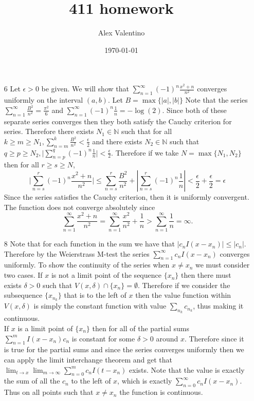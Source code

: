 \documentclass[12pt, letterpaper]{article}
\date{\today}
\author{Alex Valentino}
\title{411 homework}
\newcommand{\N}{\mathbb{N}}
\begin{document}
\begin{enumerate}
	\item[6]
	Let $\epsilon > 0$ be given.  We will show that $\sum_{n=1}^\infty (-1)^n \frac{x^2 + n}{n^2}$ converges uniformly on
	the interval $(a,b)$.  Let $B = \max\{|a|,|b|\}$   Note that the series $\sum_{n=1}^\infty \frac{B^2}{n^2} = \frac{\pi^2}{6}$ and $\sum_{n=1}^\infty (-1)^n \frac{1}{n} = -\log(2)$.  Since both of these separate series converges 
	then they both satisfy the Cauchy criterion for series.  Therefore there exists $N_1 \in \N$ such that for all 
	$k \geq m \geq N_1, \sum_{n=m}^k \frac{B^2}{n^2}  < \frac{\epsilon}{2}$ and there exists $N_2 \in \N$ 
	such that $q \geq p \geq N_2, \lvert \sum_{n = p}^q (-1)^n \frac{1}{n} \rvert < \frac{\epsilon}{2}$.  Therefore if
	we take $N = \max \{N_1, N_2\}$ then for all $r \geq s \geq N$, 
	$$
	\lvert \sum_{n = s}^r (-1)^n \frac{x^2 + n}{n^2} \rvert \leq \sum_{n = s}^r \frac{B^2}{n^2} + |\sum_{n = s}^r (-1)^n \frac{1}{n}| < \frac{\epsilon}{2} + \frac{\epsilon}{2} = \epsilon
	$$  
	Since the series satisfies the Cauchy criterion, then it is uniformly convergent.  \\
	The function does not converge absolutely since 
	$$
	\sum_{n=1}^\infty \frac{x^2 + n}{n^2} = \sum_{n=1}^\infty \frac{x^2}{n^2} + \frac{1}{n} > \sum_{n=1}^\infty \frac{1}{n} = \infty.
	$$
	\item[8] Note that for each function in the sum we have that $|c_n I(x - x_n)| \leq |c_n|$.  Therefore by the 
	Weierstrass M-test the series $\sum_{n=1}^\infty c_n I(x-x_n)$ converges uniformly.  To show the continuity of 
	the series when $x \neq x_n$ we must consider two cases.  If $x$ is not a limit point of the sequence $\{x_n\}$ then 
	there must exists $\delta > 0$ such that $V(x,\delta) \cap \{x_n\} = \emptyset$.	Therefore if we consider 
	the subsequence $\{x_{n_k}\}$ that is to the left of $x$ then the value function within $V(x,\delta)$ is simply the 
	constant function with value $\sum_{n_k} c_{n_k}$, thus making it continuous. 
	\\ If $x$ is a limit point of $\{x_n\}$ then for all of the partial sums $\sum_{n=1}^m I(x-x_n) c_n$ is constant for some $\delta > 0$ around $x$.  Therefore 
	since it is true for the partial sums and since the series converges uniformly
	then we can apply the limit interchange theorem and get that 
	$\lim_{t \to x} \lim_{m \to \infty} \sum_{n=0}^m c_n I(t - x_n)$ exists.
	Note that the value is exactly the sum of all the $c_n$ to the left of $x$,
	which is exactly $\sum_{n=0}^\infty c_n I(x - x_n)$.  Thus on all points such 
	that $x \neq x_n$ the function is continuous.  
	

\end{enumerate}
\end{document}
